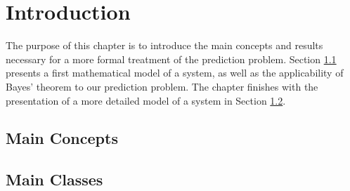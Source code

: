 \chapter{Introduction}\label{ch-int}
\thispagestyle{headings}

The purpose of this chapter is to introduce the main concepts and results necessary for
a more formal treatment of the prediction problem.
Section \ref{sc-intro-qoi} presents a first mathematical model of a system, as well as the applicability of Bayes' theorem to our prediction problem.
The chapter finishes with the presentation of a more detailed model of a system in Section \ref{sc-intro-detail}.

\section{Main Concepts}\label{sc-intro-qoi}

\section{Main Classes}\label{sc-intro-detail}

